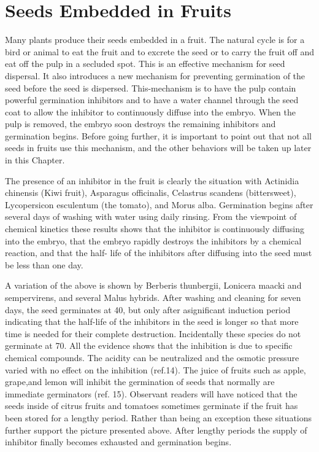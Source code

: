 \chapter{Seeds Embedded in Fruits}

Many plants produce their seeds embedded in a fruit. The natural cycle is for a
bird or animal to eat the fruit and to excrete the seed or to carry the fruit off and eat off
the pulp in a secluded spot. This is an effective mechanism for seed dispersal. It also
introduces a new mechanism for preventing germination of the seed before the seed is
dispersed. This-mechanism is to have the pulp contain powerful germination inhibitors
and to have a water channel through the seed coat to allow the inhibitor to
continuously diffuse into the embryo. When the pulp is removed, the embryo soon
destroys the remaining inhibitors and germination begins. Before going further, it is
important to point out that not all seeds in fruits use this mechanism, and the other
behaviors will be taken up later in this Chapter.

The presence of an inhibitor in the fruit is clearly the situation with Actinidia
chinensis (Kiwi fruit), Asparagus officinalis, Celastrus scandens (bittersweet),
Lycopersicon esculentum (the tomato), and Morus alba. Germination begins after
several days of washing with water using daily rinsing. From the viewpoint of chemical
kinetics these results shows that the inhibitor is continuously diffusing into the embryo,
that the embryo rapidly destroys the inhibitors by a chemical reaction, and that the half-
life of the inhibitors after diffusing into the seed must be less than one day.

A variation of the above is shown by Berberis thunbergii, Lonicera maacki and
sempervirens, and several Malus hybrids. After washing and cleaning for seven days,
the seed germinates at 40, but only after asignificant induction period indicating that
the half-life of the inhibitors in the seed is longer so that more time is needed for their
complete destruction. Incidentally these species do not germinate at 70.
All the evidence shows that the inhibition is due to specific chemical
compounds. The acidity can be neutralized and the osmotic pressure varied with no
effect on the inhibition (ref.14). The juice of fruits such as apple, grape,and lemon will
inhibit the germination of seeds that normally are immediate germinators (ref. 15).
Observant readers will have noticed that the seeds inside of citrus fruits and tomatoes
sometimes germinate if the fruit has been stored for a lengthy period. Rather than
being an exception these situations further support the picture presented above. After
lengthy periods the supply of inhibitor finally becomes exhausted and germination
begins.

